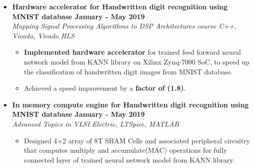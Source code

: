 \documentclass[a4paper,11pt]{article}
\newcommand{\isep}{-2 pt}
\newcommand{\spsep}{-0.75cm}
\begin{document}
\begin{itemize}
	 \item \textbf{Hardware accelerator for Handwritten digit recognition using MNIST database \hfill January - May 2019} \\
	\emph{Mapping Signal Processing Algorithms to DSP Architectures course \hfill C++, Vivado, Vivado HLS} \\[\spsep]
	\begin{itemize} \itemsep \isep
	\item \textbf{Implemented hardware accelerator} for trained feed forward neural network model from KANN library on Xilinx Zynq-7000 SoC, to speed up the classification of handwritten digit images from MNIST database.
		\item Achieved a speed improvement by a \textbf{factor of (1.8)}.
	\end{itemize}

\iffalse
	
	\item \textbf{In memory compute engine for Handwritten digit recognition using MNIST database  \hfill January - May 2019} \\
	\emph{Advanced Topics in VLSI \hfill  Electric, LTSpice, MATLAB} \\[\spsep]
	\begin{itemize} \itemsep \isep
		\item Designed 4$\times$2 array of 8T SRAM Cells and associated peripheral circuitry that computes multiply and accumulate(MAC) operations for fully connected layer of trained neural network model from KANN library.

	\end{itemize}
	

\end{itemize}
\end{document}

